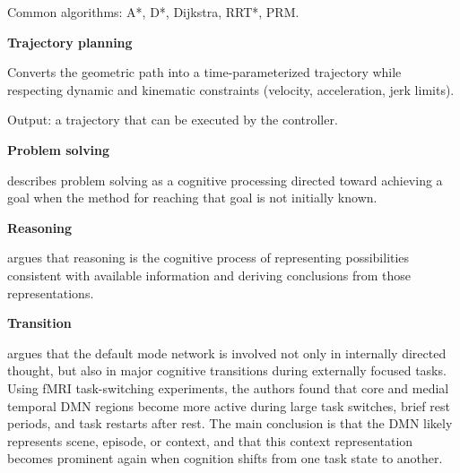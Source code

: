 \documentclass{book}
\providecommand{\ProjectDeepHeading}[2]{%
    \par\medskip\noindent\textbf{#2}\par\smallskip
}
\begin{document}
   Common algorithms: A*, D*, Dijkstra, RRT*, PRM.

\ProjectDeepHeading{8}{Trajectory planning}


Converts the geometric path into a time-parameterized trajectory while respecting dynamic and kinematic constraints (velocity, acceleration, jerk limits).
    
    Output: a trajectory that can be executed by the controller.

\ProjectDeepHeading{5}{Problem solving}


\cite{mayer-2013-problem-solving} describes problem solving as a cognitive processing directed toward achieving a goal when the method for reaching that goal is not initially known.

\ProjectDeepHeading{5}{Reasoning}


\cite{johnson-laird-2010-mental-models-and-human-reasoning}
   argues that reasoning is the cognitive process of representing possibilities consistent with available information and deriving conclusions from those representations.

\ProjectDeepHeading{4}{Transition}


\cite{smith-2018-role-of-the-default-mode-network-in-cognitive-transitions} argues that the default mode network is involved not only in internally directed thought, but also in major cognitive transitions during externally focused tasks.
    Using fMRI task-switching experiments, the authors found that core and medial temporal DMN regions become more active during large task switches, brief rest periods, and task restarts after rest.
    The main conclusion is that the DMN likely represents scene, episode, or context, and that this context representation becomes prominent again when cognition shifts from one task state to another.
\end{document}
